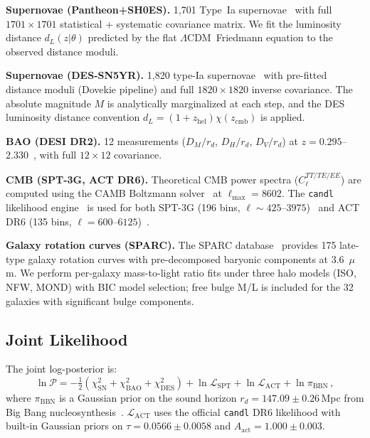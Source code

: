 \documentclass[12pt,a4paper]{article}
\newcommand{\lcdm}{$\Lambda$CDM}
\begin{document}
\textbf{Supernovae (Pantheon+SH0ES).}
1,701 Type~Ia supernovae~\cite{Scolnic2022} with full $1701\times 1701$
statistical + systematic covariance matrix.
We fit the luminosity distance $d_L(z|\theta)$ predicted by the flat
\lcdm\ Friedmann equation to the observed distance moduli.

\textbf{Supernovae (DES-SN5YR).}
1,820 type-Ia supernovae~\cite{DES2024} with pre-fitted distance moduli
(Dovekie pipeline) and full $1820\times 1820$ inverse covariance.
The absolute magnitude $M$ is analytically marginalized at each step,
and the DES luminosity distance convention
$d_L = (1+z_\mathrm{hel})\chi(z_\mathrm{cmb})$ is applied.

\textbf{BAO (DESI DR2).}
12 measurements ($D_M/r_d$, $D_H/r_d$, $D_V/r_d$) at
$z = 0.295$--$2.330$~\cite{DESI2024}, with full $12\times 12$ covariance.

\textbf{CMB (SPT-3G, ACT DR6).}
Theoretical CMB power spectra ($C_\ell^{TT/TE/EE}$) are computed using the
CAMB Boltzmann solver~\cite{Lewis2000} at $\ell_\mathrm{max} = 8602$.
The \texttt{candl} likelihood engine~\cite{Camphuis2025} is used for both
SPT-3G (196 bins, $\ell \sim 425$--$3975$)~\cite{Quan2025,Camphuis2025}
and ACT DR6 (135 bins, $\ell = 600$--$6125$)~\cite{ACT2025}.

\textbf{Galaxy rotation curves (SPARC).}
The SPARC database~\cite{Lelli2016} provides 175 late-type galaxy rotation
curves with pre-decomposed baryonic components at 3.6~$\mu$m.
We perform per-galaxy mass-to-light ratio fits under three halo models
(ISO, NFW, MOND) with BIC model selection; free bulge M/L is included for
the 32 galaxies with significant bulge components.

\subsection{Joint Likelihood}

The joint log-posterior is:
\begin{equation}
\ln\mathcal{P} = -\tfrac{1}{2}\left(\chi^2_\mathrm{SN} + \chi^2_\mathrm{BAO}
+ \chi^2_\mathrm{DES}\right)
+ \ln\mathcal{L}_\mathrm{SPT} + \ln\mathcal{L}_\mathrm{ACT}
+ \ln\pi_\mathrm{BBN}\,,
\label{eq:posterior}
\end{equation}
where $\pi_\mathrm{BBN}$ is a Gaussian prior on the sound horizon
$r_d = 147.09 \pm 0.26\,$Mpc from Big Bang nucleosynthesis~\cite{Schoneberg2024}.
$\mathcal{L}_\mathrm{ACT}$ uses the official \texttt{candl} DR6 likelihood
with built-in Gaussian priors on $\tau = 0.0566 \pm 0.0058$
and $A_\mathrm{act} = 1.000 \pm 0.003$.
\end{document}
